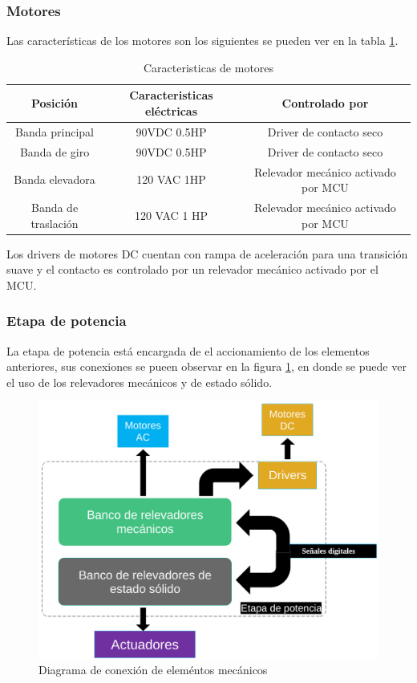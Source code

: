 \documentclass[twoside,spanish,ESP,MSc]{plantillaLabUPV}
\theoremstyle{definition}
\begin{document}
\subsubsection{Motores}
Las características de los motores son los siguientes se pueden ver en la tabla \ref{motorestab}.

\begin{table}
	\caption{Caracteristicas de motores}
	\label{motorestab}
\begin{tabular}{ccc}
	\textbf{Posición} & \textbf{Caracteristicas eléctricas} & \textbf{Controlado por} \\ 
	\hline 
	Banda principal & 90VDC 0.5HP & Driver de contacto seco \\ 
	\hline 
	Banda de giro & 90VDC 0.5HP & Driver de contacto seco \\ 
	\hline 
	Banda elevadora & 120 VAC 1HP & Relevador mecánico activado por MCU \\ 
	\hline 
	Banda de traslación & 120 VAC 1 HP & Relevador mecánico activado por MCU\\ 
\end{tabular} 
\end{table}

Los drivers de motores DC cuentan con rampa de aceleración para una transición suave y el contacto es controlado por un relevador mecánico activado por el MCU.


\subsubsection{Etapa de potencia}
La etapa de potencia está encargada de el accionamiento de los elementos anteriores, sus conexiones se pueen observar en la figura \ref{fig:etapapotencia}, en donde se puede ver el uso de los relevadores mecánicos y de estado sólido.

\begin{figure}
	\centering
	\includegraphics[width=0.7\linewidth]{edrawimas/etapapotencia}
	\caption{Diagrama de conexión de eleméntos mecánicos}
	\label{fig:etapapotencia}
\end{figure}
\end{document}
